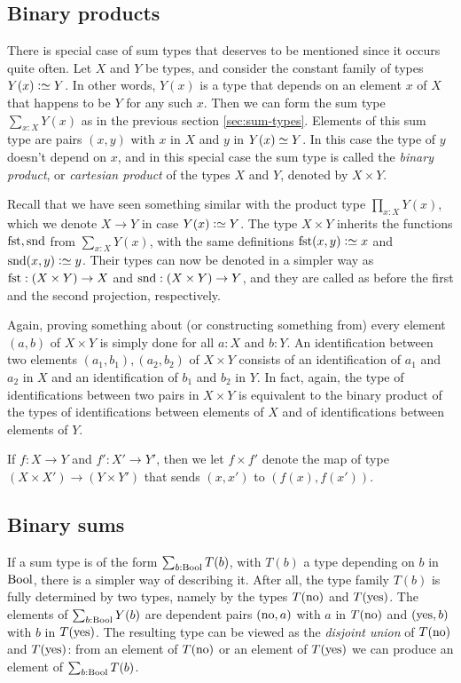 \subsection{Binary products}
\label{sec:binprod-types}
There is special case of sum types that deserves to be mentioned since
it occurs quite often. Let $X$ and $Y$ be types, and consider the constant
family of types $Y(x)\defeq Y$. In other words, $Y(x)$ is a type that depends
on an element $x$ of $X$ that happens to be $Y$ for any such $x$.
Then we can form the sum type $\sum_{x:X} Y(x)$ as in the previous
section \ref{sec:sum-types}. Elements of this sum type are pairs $(x,y)$
with $x$ in $X$ and $y$ in $Y(x)\jdeq Y$. In this case the type of $y$
doesn't depend on $x$, and in this special case the sum type is called
the \emph{binary product}, or \emph{cartesian product} of the types $X$ and $Y$,
denoted by $X \times Y$.

Recall that we have seen something similar with the product type
$\prod_{x:X} Y(x)$, which we denote $X\to Y$ in case $Y(x)\defeq Y$.
The type $X \times Y$ inherits the functions $\fst,\snd$ from
$\sum_{x:X} Y(x)$, with the same definitions $\fst(x,y)\defeq x$
and $\snd(x,y)\defeq y$. Their types can now be denoted in a
simpler way as $\fst: (X \times Y)\to X$ and 
$\snd: (X \times Y)\to Y$, and they are called as before the
first and the second projection, respectively.

Again, proving something about (or constructing something from) every 
element $(a,b)$ of $X \times Y$ is simply done for all $a:X$ and $b:Y$.
An identification between two elements $(a_1,b_1),(a_2,b_2)$ of 
$X \times Y$ consists of an identification of $a_1$ and $a_2$ in $X$
and an identification of $b_1$ and $b_2$ in $Y$. In fact, 
again, the type of identifications between two pairs in $X \times Y$
is equivalent to the binary product of the types of identifications between
elements of $X$ and of identifications between elements of $Y$.

If $f: X \to Y$ and $f': X' \to Y'$, then we let 
$f\times f'$ denote the map of type $(X\times X') \to (Y\times Y')$ 
that sends $(x,x')$ to $(f(x),f(x'))$.

\subsection{Binary sums}
\label{sec:binsum-types}
If a sum type is of the form $\sum_{b:\mathrm{Bool}} T(b)$, with $T(b)$
a type depending on $b$ in $\mathrm{Bool}$, there is a simpler way of
describing it. After all, the type family $T(b)$ is fully determined
by two types, namely by the types $T(\mathrm{no})$ and $T(\mathrm{yes})$.
The elements of $\sum_{b:\mathrm{Bool}} Y(b)$ are dependent pairs $(\mathrm{no},a)$ with
$a$ in $T(\mathrm{no})$ and $(\mathrm{yes},b)$ with $b$ in $T(\mathrm{yes})$. The resulting
type can be viewed as the \emph{disjoint union} of $T(\mathrm{no})$ and $T(\mathrm{yes})$:
from an element of $T(\mathrm{no})$ or an element of $T(\mathrm{yes})$ 
we can produce an element of $\sum_{b:\mathrm{Bool}} T(b)$.  

